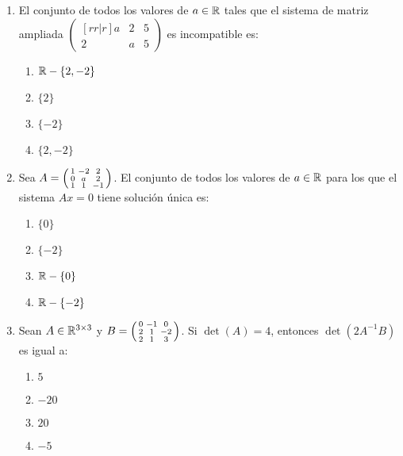 \documentclass[../practica.root.tex]{subfiles}
\begin{document}
\begin{enumerate}
          \hrulefill{}
    \item El conjunto de todos los valores de $a\in\mathbb{R}$ tales que el sistema de
          matriz ampliada $\begin{pmatrix}[rr|r]a&2&5\\2&a&5\end{pmatrix}$ es
          incompatible es:

          \begin{enumerate}
              \item $\mathbb{R}-\{2,-2\}$
              \item $\{2\}$
              \item $\{-2\}$
              \item $\{2,-2\}$
          \end{enumerate}

          \hrulefill{}
    \item Sea $A=\begin{psmallmatrix}1&-2&2\\0&a&2\\1&1&-1\end{psmallmatrix}$.
          El conjunto de todos los valores de $a\in\mathbb{R}$ para los que el sistema
          $Ax=0$ tiene solución única es:

          \begin{enumerate}
              \item $\{0\}$
              \item $\{-2\}$
              \item $\mathbb{R}-\{0\}$
              \item $\mathbb{R}-\{-2\}$
          \end{enumerate}

          \hrulefill{}
    \item Sean $A\in\mathbb{R}^{3\times 3}$ y
          $B=\begin{psmallmatrix}0&-1&0\\2&1&-2\\2&1&3\end{psmallmatrix}$. Si
          $\det(A)=4$, entonces $\det(2A^{-1}B)$ es igual a:

          \begin{enumerate}
              \item $5$
              \item $-20$
              \item $20$
              \item $-5$
          \end{enumerate}


\end{enumerate}
\end{document}
